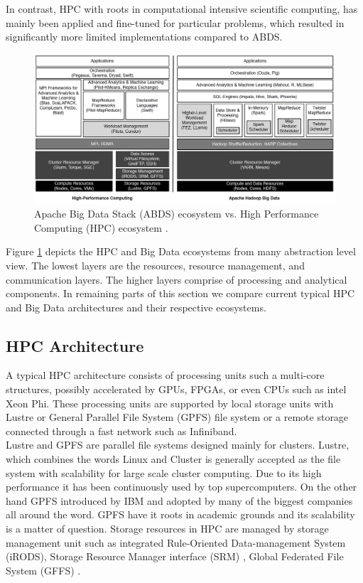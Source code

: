 \documentclass[runningheads,a4paper]{llncs}
\begin{document}
In contrast, HPC with roots in computational intensive scientific computing, has mainly been applied and fine-tuned for particular problems, which resulted in significantly more limited implementations compared to ABDS.
\begin{figure}
	\includegraphics[scale=0.33]{./images/Ecosystems.png}
	\centering
	\caption{Apache Big Data Stack (ABDS) ecosystem vs. High Performance Computing (HPC) ecosystem \cite{Jha2014}.}
	\label{fig:bigdata_hpc_ecosystem}
\end{figure}
Figure \ref*{fig:bigdata_hpc_ecosystem} depicts the HPC and Big Data ecosystems from many abstraction level view. The lowest layers are the resources, resource management, and communication layers. The higher layers comprise of processing and analytical components. In remaining parts of this section we compare current typical HPC and Big Data architectures and their respective ecosystems.
\subsection{HPC Architecture}
A typical HPC architecture consists of processing units such a multi-core structures, possibly accelerated by GPUs, FPGAs, or even CPUs such as intel Xeon Phi. These processing units are supported by local storage units with Lustre \cite{braam2004lustre} or General Parallel File System (GPFS) \cite{FrankSchmuck} file system or a remote storage connected through a fast network such as Infiniband.\\

Lustre and GPFS are parallel file systems designed mainly for clusters. Lustre, which combines the words Linux and Cluster is generally accepted as the file system with scalability for large scale cluster computing. Due to its high performance it has been continuously used by top supercomputers. On the other hand GPFS introduced by IBM and adopted by many of the biggest companies all around the word. GPFS have it roots in academic grounds and its scalability is a matter of question. Storage resources in HPC are managed by storage management unit such as integrated Rule-Oriented Data-management System (iRODS), Storage Resource Manager interface (SRM) \cite{shaun2007storage} \cite{rajasekar2010irods},  Global Federated File System (GFFS) \cite{grimshaw2013gffs}.\\
\end{document}
